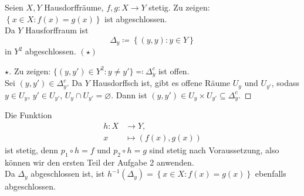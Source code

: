 \begin{problem}[3]
  Seien \( X, Y \) Hausdorffräume, \( f,g : X \to Y \) stetig. Zu zeigen: \( \left \{ x \in X : f(x) = g(x) \right \} \) ist abgeschlossen. \\
  Da \( Y \) Hausforffraum ist
  \begin{equation*}
    \Delta_y \coloneqq \left \{ (y,y): y \in Y \right \}
  \end{equation*}
  in \( Y^2 \) abgeschlossen. \( (\star) \)
  \begin{proof}[ \( \star \)]
    Zu zeigen: \( \{ (y, y') \in Y^2 : y \neq y' \} \eqqcolon \Delta_y^c \) ist offen. \\
    Sei \( (y,y') \in \Delta_y^c \). Da \( Y \) Hausdorffsch ist, gibt es offene Räume \( U_y \) und \( U_{y'} \), sodass \( y \in U_y \), \( y' \in U_{y'} \), \( U_y \cap U_{y'} = \varnothing \). Dann ist \( (y, y') \in U_y \times U_{y'} \subseteq \Delta_y^c \).
  \end{proof}
  Die Funktion
  \begin{align*}
    h : X &\to Y\text{,} \\
    x &\mapsto (f(x), g(x))
  \end{align*}
  ist stetig, denn \( p_1 \circ h = f \) und \( p_2 \circ h = g \) sind stetig nach Voraussetzung, also können wir den ersten Teil der Aufgabe 2 anwenden. \\
  Da \( \Delta_y \) abgeschlossen ist, ist \( h^{-1}(\Delta_y) = \left \{ x \in X : f(x) = g(x) \right \} \) ebenfalls abgeschlossen.
\end{problem}

